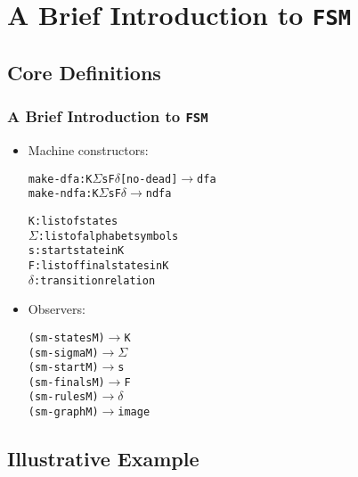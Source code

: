 \documentclass{beamer}
\newcommand{\fsm}{\texttt{FSM}}
\newcommand{\arrow}{\(\rightarrow\)}
\newcommand{\sig}{\texttt{\(\Sigma\)}}
\newcommand{\delt}{\texttt{\(\delta\)}}
\newcommand{\quot}{\texttt{\textquotesingle{}}}
\begin{document}
\section{A Brief Introduction to \fsm}
\subsection{Core Definitions}

\begin{frame}[fragile]
\frametitle{A Brief Introduction to \fsm}
\begin{scriptsize}
\begin{itemize}
\normalsize
\item<1-> Machine constructors:
\begin{alltt}
      make-dfa: K \sig{} s F \delt{} [\quot{}no-dead] \arrow{} dfa
     make-ndfa: K \sig{} s F \delt{}            \arrow{} ndfa

     K: list of states
     \sig{}: list of alphabet symbols
     s: start  state in K
     F: list of final states in K
     \delt{}: transition relation
\end{alltt}

\item<2-> Observers:
\begin{alltt}
     (sm-states M) \arrow{} K
     (sm-sigma M)  \arrow{} \sig
     (sm-start M)  \arrow{} s
     (sm-finals M) \arrow{} F
     (sm-rules M)  \arrow{} \delt{}
     (sm-graph M)  \arrow image
\end{alltt}

\end{itemize}
\end{scriptsize}
\end{frame}


\subsection{Illustrative Example}
\end{document}
